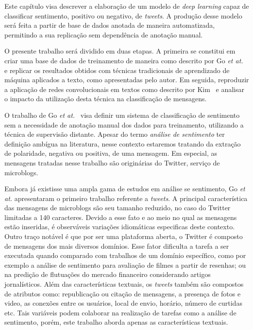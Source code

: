 Este capítulo visa descrever a elaboração de um modelo de \textit{deep learning} capaz de classificar sentimento,
positivo ou negativo, de \textit{tweets}.
A produção desse modelo será feita a partir de base de dados anotada de maneira automatizada, permitindo a sua
replicação sem dependência de anotação manual.

O presente trabalho será dividido em duas etapas.
A primeira se constitui em criar uma base de dados de treinamento de maneira como descrito por Go
\textit{et at.}~\cite{go09} e replicar os resultados obtidos com técnicas tradicionais de aprendizado de máquina
aplicados a texto, como apresentadas pelo autor.
Em seguida, reproduzir a aplicação de redes convolucionais em textos como descrito por Kim~\cite{kim14} e analisar o
impacto da utilização desta técnica na classificação de mensagens.

O trabalho de Go \textit{et at.}~\cite{go09} visa definir um sistema de classificação de sentimento sem a necessidade de
anotação manual dos dados para treinamento, utilizando a técnica de supervisão distante.
Apesar do termo \textit{análise de sentimento} ter definição ambígua na literatura, nesse contexto estaremos tratando da
extração de polaridade, negativa ou positiva, de uma mensagem.
Em especial, as mensagens tratadas nesse trabalho são originárias do Twitter, serviço de microblogs.

Embora já existisse uma ampla gama de estudos em análise se sentimento, Go \textit{et at.} apresentaram o primeiro
trabalho referente a \textit{tweets}.
A principal característica das mensagens de microblogs são seu tamanho reduzido, no caso do Twitter limitadas a
140 caracteres.
Devido a esse fato e ao meio no qual as mensagens estão inseridas, é observáveis variações idiomáticas especificas deste
contexto.
Outro traço notável é que por ser uma plataforma aberta, o Twitter é composto de mensagens dos mais diversos domínios.
Esse fator dificulta a tarefa a ser executada quando comparado com trabalhos de um domínio específico, como por exemplo
a análise de sentimento para avaliação de filmes a partir de resenhas; ou na predição de flutuações do mercado financeiro
considerando artigos jornalísticos.
Além das características textuais, os \textit{tweets} também são compostos de atributos como: republicação ou citação de
mensagens, a presença de fotos e video, as conexões entre os usuários, local de envio, horário, número de curtidas etc.
Tais variáveis podem colaborar na realização de tarefas como a análise de sentimento, porém, este trabalho aborda apenas
as características textuais.


